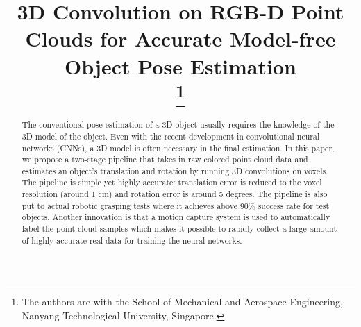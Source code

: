 \documentclass[conference]{IEEEtran}
\begin{document}
\title{3D Convolution on RGB-D Point Clouds for Accurate Model-free Object Pose Estimation \\
\thanks{The authors are with the School of Mechanical and Aerospace Engineering, Nanyang Technological University, Singapore.
}
}

\author{
\and
{}
\and
{}
}

\maketitle

\begin{abstract}
The conventional pose estimation of a 3D object usually requires the knowledge of the 3D model of the object. Even with the recent development in convolutional neural networks (CNNs), a 3D model is often necessary in the final estimation. In this paper, we propose a  two-stage pipeline that takes in raw colored point cloud data and estimates an object’s translation and rotation by running 3D convolutions on voxels. The pipeline is simple yet highly accurate: translation error is reduced to the voxel resolution (around 1 cm) and rotation error is around 5 degrees. The pipeline is also put to actual robotic grasping tests where it achieves above 90\% success rate for test objects. Another innovation is that a motion capture system is used to automatically label the point cloud samples which makes it possible to rapidly collect a large amount of highly accurate real data for training the neural networks. 
\end{abstract}
\end{document}
